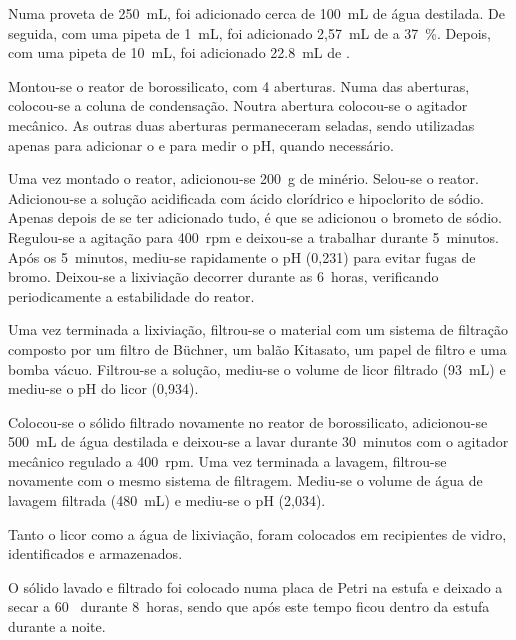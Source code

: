 Numa proveta de 250~mL, foi adicionado cerca de 100~mL de água destilada.
De seguida, com uma pipeta de 1~mL, foi adicionado 2,57~mL de \acl{} a 37~\%.
Depois, com uma pipeta de 10~mL, foi adicionado 22.8~mL de \hipso{}.

Montou-se o reator de borossilicato, com 4 aberturas. 
Numa das aberturas, colocou-se a coluna de condensação. 
Noutra abertura colocou-se o agitador mecânico.
As outras duas aberturas permaneceram seladas, sendo utilizadas apenas para adicionar o \bromo{} e para medir o pH, quando necessário.


Uma vez montado o reator, adicionou-se 200~g de minério.
Selou-se o reator.
Adicionou-se a solução acidificada com ácido clorídrico e hipoclorito de sódio.
Apenas depois de se ter adicionado tudo, é que se adicionou o brometo de sódio.
Regulou-se a agitação para 400~rpm e deixou-se a trabalhar durante 5~minutos.
Após os 5~minutos, mediu-se rapidamente o pH (0,231) para evitar fugas de bromo.
Deixou-se a lixiviação decorrer durante as 6~horas, verificando periodicamente a estabilidade do reator.

Uma vez terminada a lixiviação, filtrou-se o material com um sistema de filtração composto por um filtro de Büchner, um balão Kitasato, um papel de filtro e uma bomba vácuo.
Filtrou-se a solução, mediu-se o volume de licor filtrado (93~mL) e mediu-se o pH do licor (0,934).

Colocou-se o sólido filtrado novamente no reator de borossilicato, adicionou-se 500~mL de água destilada e deixou-se a lavar durante 30~minutos com o agitador mecânico regulado a 400~rpm.
Uma vez terminada a lavagem, filtrou-se novamente com o mesmo sistema de filtragem.
Mediu-se o volume de água de lavagem filtrada (480~mL) e mediu-se o pH (2,034).

Tanto o licor como a água de lixiviação, foram colocados em recipientes de vidro, identificados e armazenados.

O sólido lavado e filtrado foi colocado numa placa de Petri na estufa e deixado a secar a 60~\graus{} durante 8~horas, sendo que após este tempo ficou dentro da estufa durante a noite.

